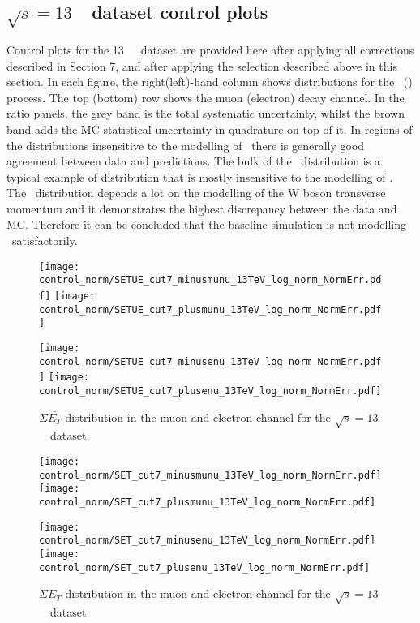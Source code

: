 



\subsection{$\sqrt{s} = 13$~\TeV\ dataset control plots}
\label{subsec:controlplots13}
Control plots for the 13~\TeV\ \lowmu\ dataset are provided here after applying all corrections described in Section 7, and after applying the selection described above in this section. In each figure, the right(left)-hand column shows distributions for the \Wplus\ (\Wminus) process. The top (bottom) row shows the muon (electron) decay channel. In the ratio panels, the grey band is the total systematic uncertainty, whilst the brown band adds the MC statistical uncertainty in quadrature on top of it. In regions of the distributions insensitive to the modelling of \ptw\ there is generally good agreement between data and predictions. The bulk of the \mt\ distribution is a typical example of distribution that is mostly insensitive to the modelling of \ptw. The \ut\ distribution depends a lot on the modelling of the W boson transverse momentum and it demonstrates the highest discrepancy between the data and MC. Therefore it can be concluded that the baseline simulation is not modelling \ptw\ satisfactorily.
\newpage


\begin{figure}[h]
	\centering
	{\texttt{[image: control\_norm/SETUE\_cut7\_minusmunu\_13TeV\_log\_norm\_NormErr.pdf]}\label{f:SETUEmm13}}
	{\texttt{[image: control\_norm/SETUE\_cut7\_plusmunu\_13TeV\_log\_norm\_NormErr.pdf]}\label{f:SETUEpm13}}
	
	{\texttt{[image: control\_norm/SETUE\_cut7\_minusenu\_13TeV\_log\_norm\_NormErr.pdf]}\label{f:}}
	{\texttt{[image: control\_norm/SETUE\_cut7\_plusenu\_13TeV\_log\_norm\_NormErr.pdf]}\label{f:}}
	\caption{$\Sigma \bar{E_T}$ distribution in the muon and electron channel  for the $\sqrt{s} = 13$~\TeV\ dataset.}\end{figure}
%

\begin{figure}[h]
	\centering
	{\texttt{[image: control\_norm/SET\_cut7\_minusmunu\_13TeV\_log\_norm\_NormErr.pdf]}\label{f:set13}}
	{\texttt{[image: control\_norm/SET\_cut7\_plusmunu\_13TeV\_log\_norm\_NormErr.pdf]}\label{f:setpl}}
	
	{\texttt{[image: control\_norm/SET\_cut7\_minusenu\_13TeV\_log\_norm\_NormErr.pdf]}\label{f:}}
	{\texttt{[image: control\_norm/SET\_cut7\_plusenu\_13TeV\_log\_norm\_NormErr.pdf]}\label{f:}}
	\caption{$\Sigma{E_T}$ distribution in the muon and electron channel  for the $\sqrt{s} = 13$~\TeV\ dataset.}\end{figure}



